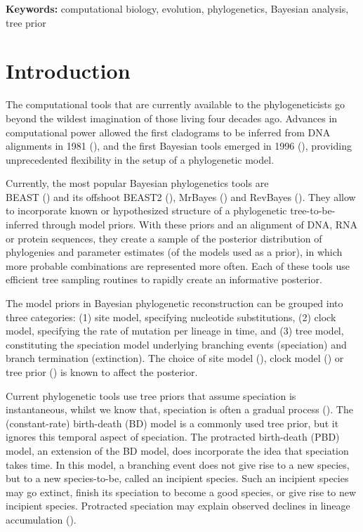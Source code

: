 {\bf Keywords:} computational biology, evolution, phylogenetics, Bayesian analysis, tree prior

\section{Introduction}

The computational tools that are currently available 
to the phylogeneticists go beyond the wildest 
imagination of those living four decades ago.
Advances in computational power allowed the first cladograms to be inferred 
from DNA alignments in 1981 (\cite{felsenstein1981}), and  
the first Bayesian tools emerged in 1996 (\cite{rannala1996}),
providing unprecedented flexibility in the setup of a phylogenetic model.

Currently, the most popular Bayesian phylogenetics tools are \\ 
BEAST (\cite{beast}) and its offshoot BEAST2 (\cite{beast2}), 
MrBayes (\cite{mrbayes}) and RevBayes (\cite{revbayes}). 
They allow to incorporate known or hypothesized structure of a phylogenetic 
tree-to-be-inferred through model priors. 
With these priors and an alignment of DNA, RNA or protein sequences, 
they create a sample of the posterior distribution
of phylogenies and parameter estimates (of the models used as a prior), 
in which more probable combinations are represented more often.
Each of these tools use efficient tree sampling routines to rapidly create an 
informative posterior.

The model priors in Bayesian phylogenetic reconstruction 
can be grouped into three categories: (1) site model, specifying 
nucleotide substitutions, (2) clock model, specifying
the rate of mutation per lineage in time, and (3) tree model, 
constituting the speciation model underlying branching events (speciation) 
and branch termination (extinction).
The choice of site model (\cite{posada_and_buckley_2004}), 
clock model (\cite{baele_et_al_2012}) 
or tree prior (\cite{moller2018, yang_and_ranalla_2005}) is known to affect
the posterior.

Current phylogenetic tools use tree priors 
that assume speciation is instantaneous, whilst we know that, 
speciation is often a gradual process (\cite{schluter2009}).
The (constant-rate) birth-death (BD) model is a commonly 
used tree prior, but it ignores this temporal aspect of speciation.
The protracted birth-death (PBD) model, an extension of 
the BD model, does incorporate the idea that speciation takes time.
In this model, a branching event does not give rise to a new species, but to
a new species-to-be, called an incipient species. Such an incipient
species may go extinct, finish its speciation to become a good species, or give
rise to new incipient species. Protracted speciation may explain observed 
declines in lineage accumulation (\cite{etienne_and_rosindell_2012}).

